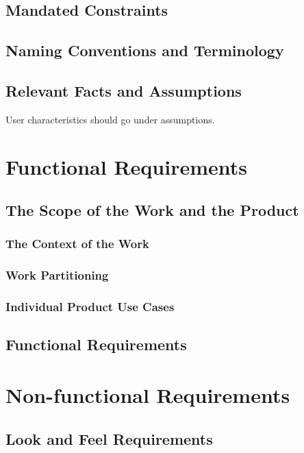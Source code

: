 \documentclass[12pt, titlepage]{article}
\begin{document}
    	\subsection{Mandated Constraints}

    	\subsection{Naming Conventions and Terminology}

    	\subsection{Relevant Facts and Assumptions}

    	User characteristics should go under assumptions.
	
	\newpage
    \section{Functional Requirements}

    	\subsection{The Scope of the Work and the Product}

    		\subsubsection{The Context of the Work}

    		\subsubsection{Work Partitioning}

    		\subsubsection{Individual Product Use Cases}

    	\subsection{Functional Requirements}
	
	\newpage
    \section{Non-functional Requirements}

    	\subsection{Look and Feel Requirements}
\end{document}
